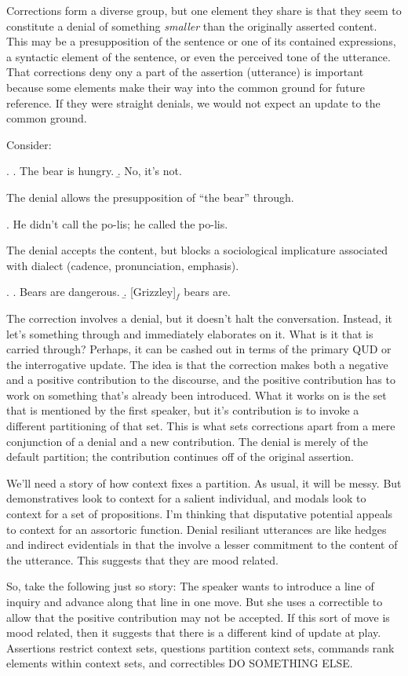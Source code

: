\documentclass{article}
\begin{document}
Corrections form a diverse group, but one element they share is that they seem to constitute a denial of something \textit{smaller} than the originally asserted content.  This may be a presupposition of the sentence or one of its contained expressions, a syntactic element of the sentence, or even the perceived tone of the utterance.  That corrections deny ony a part of the assertion (utterance) is important because some elements make their way into the common ground for future reference.  If they were straight denials, we would not expect an update to the common ground.

Consider:

\ex. \a. The bear is hungry.
\b. No, it's not.

The denial allows the presupposition of ``the bear'' through.

\ex. He didn't call the po-lis; he called the po-lis.

The denial accepts the content, but blocks a sociological implicature associated with dialect (cadence, pronunciation, emphasis).

\ex. \a. Bears are dangerous.
\b. [Grizzley]$_f$ bears are.

The correction involves a denial, but it doesn't halt the conversation. Instead, it let's something through and immediately elaborates on it. What is it that is carried through? Perhaps, it can be cashed out in terms of the primary QUD or the interrogative update.  The idea is that the correction makes both a negative and a positive contribution to the discourse, and the positive contribution has to work on something that's already been introduced.  What it works on is the set that is mentioned by the first speaker, but it's contribution is to invoke a different partitioning of that set.  This is what sets corrections apart from a mere conjunction of a denial and a new contribution.  The denial is merely of the default partition; the contribution continues off of the original assertion.

We'll need a story of how context fixes a partition.  As usual, it will be messy.  But demonstratives look to context for a salient individual, and modals look to context for a set of propositions.  I'm thinking that disputative potential appeals to context for an assortoric function.  Denial resiliant utterances are like hedges and indirect evidentials in that the involve a lesser commitment to the content of the utterance.  This suggests that they are mood related.

So, take the following just so story: The speaker wants to introduce a line of inquiry and advance along that line in one move. But she uses a correctible to allow that the positive contribution may not be accepted. If this sort of move is mood related, then it suggests that there is a different kind of update at play.  Assertions restrict context sets, questions partition context sets, commands rank elements within context sets, and correctibles DO SOMETHING ELSE.
\end{document}
